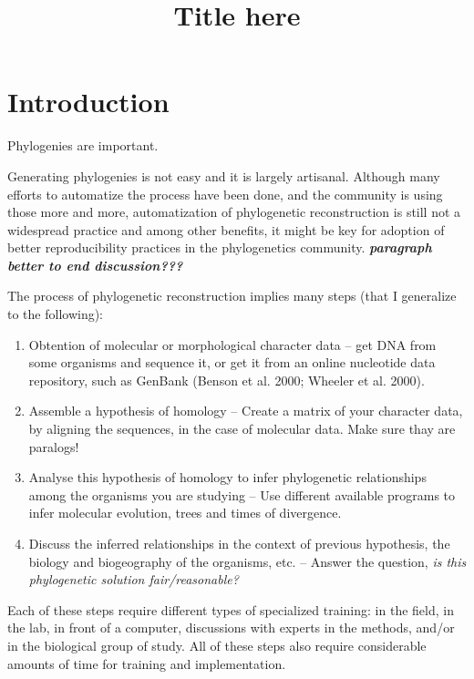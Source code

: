\documentclass[draft]{ametsoc}
\title{Title here}
\affiliation{American Meteorological Society,Boston, Massachusetts}
\begin{document}
\maketitle
\hypertarget{introduction}{%
\section{Introduction}\label{introduction}}

Phylogenies are important.

Generating phylogenies is not easy and it is largely artisanal. Although
many efforts to automatize the process have been done, and the community
is using those more and more, automatization of phylogenetic
reconstruction is still not a widespread practice and among other
benefits, it might be key for adoption of better reproducibility
practices in the phylogenetics community. \textbf{\emph{paragraph better
to end discussion??? }}

The process of phylogenetic reconstruction implies many steps (that I
generalize to the following):

\begin{enumerate}
\def\labelenumi{\arabic{enumi}.}
\tightlist
\item
  Obtention of molecular or morphological character data -- get DNA from
  some organisms and sequence it, or get it from an online nucleotide
  data repository, such as GenBank (Benson et al. 2000; Wheeler et al.
  2000).
\item
  Assemble a hypothesis of homology -- Create a matrix of your character
  data, by aligning the sequences, in the case of molecular data. Make
  sure thay are paralogs!
\item
  Analyse this hypothesis of homology to infer phylogenetic
  relationships among the organisms you are studying -- Use different
  available programs to infer molecular evolution, trees and times of
  divergence.
\item
  Discuss the inferred relationships in the context of previous
  hypothesis, the biology and biogeography of the organisms, etc. --
  Answer the question, \emph{is this phylogenetic solution
  fair/reasonable?}
\end{enumerate}

Each of these steps require different types of specialized training: in
the field, in the lab, in front of a computer, discussions with experts
in the methods, and/or in the biological group of study. All of these
steps also require considerable amounts of time for training and
implementation.
\end{document}
